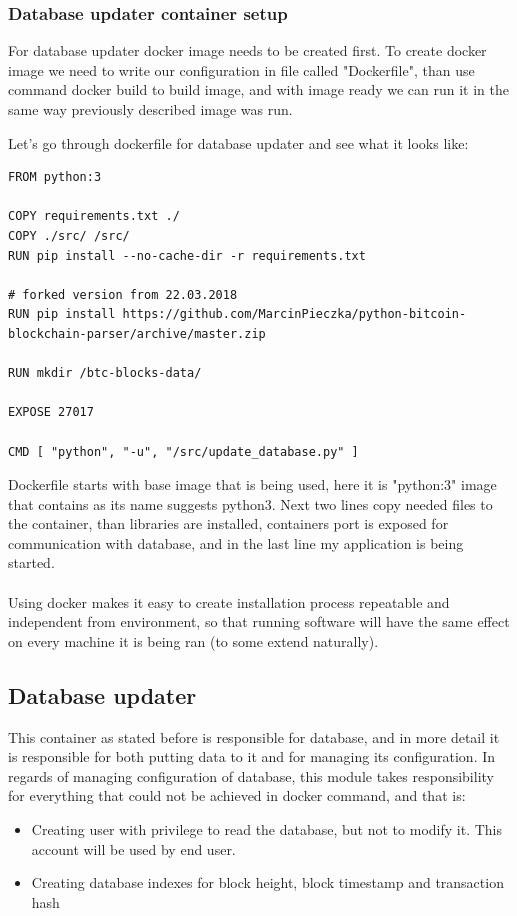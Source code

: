 \documentclass[12pt, en, eng]{mgr}
\begin{document}
\subsubsection{Database updater container setup}
For database updater docker image needs to be created first. To create docker image we need to write our configuration in file called "Dockerfile", than use command docker build to build image, and with image ready we can run it in the same way previously described image was run.

Let's go through dockerfile for database updater and see what it looks like:
\begin{verbatim}
FROM python:3

COPY requirements.txt ./
COPY ./src/ /src/
RUN pip install --no-cache-dir -r requirements.txt

# forked version from 22.03.2018
RUN pip install https://github.com/MarcinPieczka/python-bitcoin-blockchain-parser/archive/master.zip

RUN mkdir /btc-blocks-data/

EXPOSE 27017

CMD [ "python", "-u", "/src/update_database.py" ]
\end{verbatim}

Dockerfile starts with base image that is being used, here it is "python:3" image that contains as its name suggests python3.
Next two lines copy needed files to the container, than libraries are installed, containers port is exposed for communication with database, and in the last line my application is being started.
\\
\\
Using docker makes it easy to create installation process repeatable and independent from environment, so that running software will have the same effect on every machine it is being ran (to some extend naturally). 

\subsection{Database updater}
This container as stated before is responsible for database, and in more detail it is responsible for both putting data to it and for managing its configuration. In regards of managing configuration of database, this module takes responsibility for everything that could not be achieved in docker command, and that is:

\begin{itemize}
\item
Creating user with privilege to read the database, but not to modify it. This account will be used by end user.
\item
Creating database indexes for block height, block timestamp and transaction hash
\end{itemize}
\end{document}
